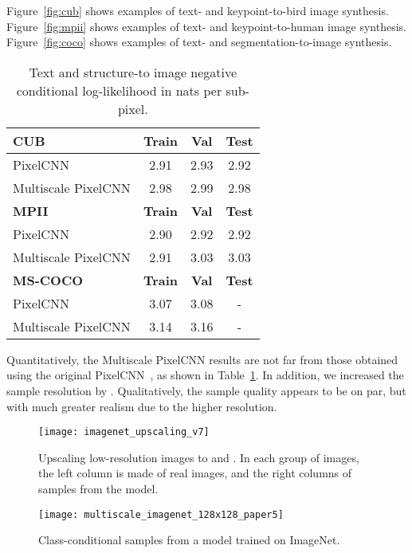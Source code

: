 \documentclass{article}
\begin{document}
Figure~\ref{fig:cub} shows examples of text- and keypoint-to-bird image synthesis.
Figure~\ref{fig:mpii} shows examples of text- and keypoint-to-human image synthesis.
Figure~\ref{fig:coco} shows examples of text- and segmentation-to-image synthesis.



\begin{table}[h!]
\begin{center}
\begin{tabular}{| l | c | c | c |}
\hline
\textbf{CUB} & \textbf{Train} & \textbf{Val} & \textbf{Test} \\
\hline
\hline
PixelCNN & 2.91  & 2.93 & 2.92 \\ \hline
Multiscale PixelCNN & 2.98 & 2.99 & 2.98 \\ 
\hline
\hline
\textbf{MPII} & \textbf{Train} & \textbf{Val} & \textbf{Test} \\ \hline
PixelCNN & 2.90 & 2.92 & 2.92 \\ \hline
Multiscale PixelCNN & 2.91 & 3.03 & 3.03 \\ 
\hline
\hline
\textbf{MS-COCO} & \textbf{Train} & \textbf{Val} & \textbf{Test} \\ \hline
PixelCNN & 3.07 & 3.08 & - \\ \hline
Multiscale PixelCNN & 3.14 & 3.16 & - \\ 
\hline
\end{tabular}
\vspace{-0.1in}
\end{center}
\vspace{-0.05in}
\caption{Text and structure-to image negative conditional log-likelihood in nats per sub-pixel.\label{tab:txt2img}}
\vspace{-0.3in}
\end{table}
Quantitatively, the Multiscale PixelCNN results are not far from those obtained using the original PixelCNN~\citep{reed2016generating}, as shown in Table~\ref{tab:txt2img}.
In addition, we increased the sample resolution by .
Qualitatively, the sample quality appears to be on par, but with much greater realism due to the higher resolution.

\begin{figure*}[t!]
\centering
\texttt{[image: imagenet\_upscaling\_v7]}
\vspace{-0.3in}
\caption{Upscaling low-resolution images to  and . In each group of images, the left column is made of real images, and the right columns of samples from the model.\label{fig:imagenet1}}
\vspace{0.1in}
\texttt{[image: multiscale\_imagenet\_128x128\_paper5]}
\vspace{-0.3in}
\caption{Class-conditional  samples from a model trained on ImageNet.\label{fig:imagenet2}}
\vspace{-0.1in}
\end{figure*}
\end{document}
